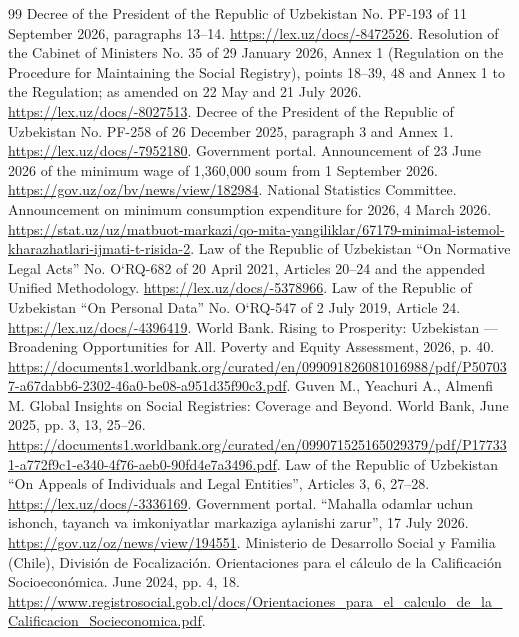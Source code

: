 \documentclass[12pt,a4paper]{extarticle}
\begin{document}
\begingroup\fontsize{12bp}{14.4bp}\selectfont
\begin{thebibliography}{99}
 Decree of the President of the Republic of Uzbekistan No. PF-193 of 11 September 2026, paragraphs 13–14. \url{https://lex.uz/docs/-8472526}.
 Resolution of the Cabinet of Ministers No. 35 of 29 January 2026, Annex 1 (Regulation on the Procedure for Maintaining the Social Registry), points 18–39, 48 and Annex 1 to the Regulation; as amended on 22 May and 21 July 2026. \url{https://lex.uz/docs/-8027513}.
 Decree of the President of the Republic of Uzbekistan No. PF-258 of 26 December 2025, paragraph 3 and Annex 1. \url{https://lex.uz/docs/-7952180}.
 Government portal. Announcement of 23 June 2026 of the minimum wage of 1,360,000 soum from 1 September 2026. \url{https://gov.uz/oz/bv/news/view/182984}.
 National Statistics Committee. Announcement on minimum consumption expenditure for 2026, 4 March 2026. \url{https://stat.uz/uz/matbuot-markazi/qo-mita-yangiliklar/67179-minimal-istemol-kharazhatlari-ijmati-t-risida-2}.
 Law of the Republic of Uzbekistan “On Normative Legal Acts” No. O‘RQ-682 of 20 April 2021, Articles 20–24 and the appended Unified Methodology. \url{https://lex.uz/docs/-5378966}.
 Law of the Republic of Uzbekistan “On Personal Data” No. O‘RQ-547 of 2 July 2019, Article 24. \url{https://lex.uz/docs/-4396419}.
 World Bank. Rising to Prosperity: Uzbekistan — Broadening Opportunities for All. Poverty and Equity Assessment, 2026, p. 40. \url{https://documents1.worldbank.org/curated/en/099091826081016988/pdf/P507037-a67dabb6-2302-46a0-be08-a951d35f90c3.pdf}.
 Guven M., Yeachuri A., Almenfi M. Global Insights on Social Registries: Coverage and Beyond. World Bank, June 2025, pp. 3, 13, 25–26. \url{https://documents1.worldbank.org/curated/en/099071525165029379/pdf/P177331-a772f9c1-e340-4f76-aeb0-90fd4e7a3496.pdf}.
 Law of the Republic of Uzbekistan “On Appeals of Individuals and Legal Entities”, Articles 3, 6, 27–28. \url{https://lex.uz/docs/-3336169}.
 Government portal. “Mahalla odamlar uchun ishonch, tayanch va imkoniyatlar markaziga aylanishi zarur”, 17 July 2026. \url{https://gov.uz/oz/news/view/194551}.
 Ministerio de Desarrollo Social y Familia (Chile), División de Focalización. Orientaciones para el cálculo de la Calificación Socioeconómica. June 2024, pp. 4, 18. \url{https://www.registrosocial.gob.cl/docs/Orientaciones_para_el_calculo_de_la_Calificacion_Socieconomica.pdf}.
\end{thebibliography}\endgroup
\end{document}
